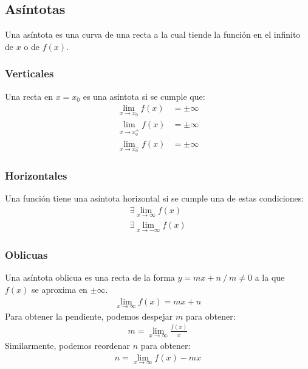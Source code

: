 \documentclass{article}
\begin{document}
\subsection{Asíntotas}
Una asíntota es una curva de una recta a la cual tiende la función en el
infinito de $x$ o de $f(x)$.
\subsubsection{Verticales}
Una recta en $x=x_{0}$ es una asíntota si se cumple que:
\begin{equation}
    \begin{split}
        \lim_{x \to x_{0}}f(x)&= \pm \infty\\
        \lim_{x \to x_{0}^{+}} f(x) &= \pm \infty\\
        \lim_{x \to x_{0}^{-}} f(x) &= \pm \infty
    \end{split}
\end{equation}
\subsubsection{Horizontales}
Una función tiene una asíntota horizontal si se cumple una de estas
condiciones:
\begin{equation}
    \begin{split}
        \exists \lim_{x \to \infty}f(x)\\
        \exists \lim_{x \to -\infty}f(x)
    \end{split}
\end{equation}
\subsubsection{Oblicuas}
Una asíntota oblicua es una recta de la forma $y=mx+n\: / \: m \neq 0$ a
la que $f(x)$ se aproxima en $\pm \infty$.
\begin{equation}
    \begin{split}
        \lim_{x \to \infty} f(x) = mx+n 
    \end{split}
\end{equation}
Para obtener la pendiente, podemos despejar $m$ para obtener:
\begin{equation}
    \begin{split}
        m = \lim_{x \to \infty} \frac{f(x)}{x}
    \end{split}
\end{equation}
Similarmente, podemos reordenar $n$ para obtener:
\begin{equation}
    \begin{split}
        n = \lim_{x \to \infty} f(x) -mx
    \end{split}
\end{equation}
\end{document}

